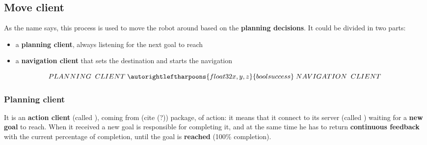 \subsection{Move client}

As the name says, this process is used to move the robot around based on the \textbf{planning decisions}. It could be divided in two parts:

\begin{itemize}
    \item a \textbf{planning client}, always listening for the next goal to reach
    \item a \textbf{navigation client} that sets the destination and starts the navigation
\end{itemize}

$$  
    PLANNING \;\; CLIENT \; 
        \autorightleftharpoons{float32 x, y, z}{bool success} \;
    NAVIGATION \;\; CLIENT
$$ 
    

\subsubsection{Planning client}


It is an \textbf{action client} (called ), coming from  (cite (?)) package, of  action: it means that it connect to its server (called ) waiting for a \textbf{new goal} to reach. When it received a new goal is responsible for completing it, and at the same time he has to return \textbf{continuous feedback
} with the current percentage of completion, until the goal is \textbf{reached} (100\% completion).



